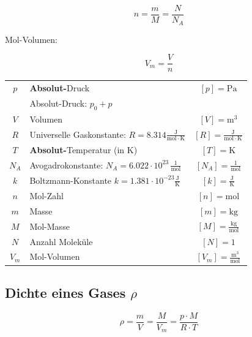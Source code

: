 $$  \boxed{ n = \frac{m}{M} = \frac{N}{N_A} } $$


Mol-Volumen:

$$ \boxed{ V_m = \frac{V}{n} }$$



\begin{tabular}{c l c}
	$p$ & \textbf{Absolut-}Druck & $[p] = \mathrm{Pa}$ \\
	    & Absolut-Druck: $p_0 + p$ & \\
	$V$ & Volumen & $[V] = \mathrm{m^3}$ \\
	\rule{0pt}{8pt}$R$ & Universelle Gaskonstante: $R = 8.314 \mathrm{\frac{J}{mol \cdot K}}$ & $[R] = \mathrm{\frac{J}{mol \cdot K}} $ \\
	$T$ & \textbf{Absolut-}Temperatur (in K) & $[T] = \mathrm{K}$ \\
	\rule{0pt}{8pt}$N_A$ & 	Avogadrokonstante: $N_A = 6.022 \cdot 10^{23} \, \mathrm{\frac{1}{mol}} $ & $[N_A] =  \mathrm{\frac{1}{mol}}$  \\	
	\rule{0pt}{8pt}$k$ & Boltzmann-Konstante $k = 1.381 \cdot 10^{-23} \mathrm{\frac{J}{K}}$ & $[k] = \mathrm{\frac{J}{K}}$ \\	
	$n$ & Mol-Zahl & $[n] = \mathrm{mol}$ \\
	$m$ & Masse & $[m] = \mathrm{kg}$ \\
	\rule{0pt}{8pt}$M$ & Mol-Masse & $[M] = \mathrm{\frac{kg}{mol}}$ \\
	$N$ & Anzahl Moleküle & $[N] = 1$ \\
	\rule{0pt}{8pt}$V_m$ & Mol-Volumen & $[V_m] = \mathrm{\frac{m^3}{mol}}$ \\
\end{tabular}




\subsection{Dichte eines Gases $\rho$}

$$ \boxed{ \rho = \frac{m}{V} = \frac{M}{V_m} = \frac{p \cdot M}{R \cdot T} }$$


